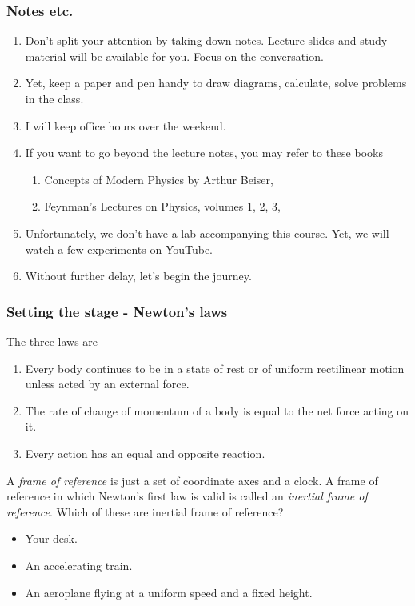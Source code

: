 \documentclass{beamer}
\begin{document}
\begin{frame}
\frametitle{Notes etc.}
\begin{enumerate}
\item Don't split your attention by taking down notes. Lecture slides and study
material will be available for you. Focus on the conversation.
\item Yet, keep a paper and pen handy to draw diagrams, calculate, solve 
problems in the class.
\item I will keep office hours over the weekend.
\item If you want to go beyond the lecture notes, you may refer to these books
\begin{enumerate}
\item Concepts of Modern Physics by Arthur Beiser,
\item Feynman's Lectures on Physics, volumes 1, 2, 3,
\end{enumerate}
\item Unfortunately, we don't have a lab accompanying this course. Yet, we will
watch a few experiments on YouTube.
\item Without further delay, let's begin the journey.
\end{enumerate}
\end{frame}

\begin{frame}
\frametitle{Setting the stage - Newton's laws}
The three laws are
\begin{enumerate}
\item Every body continues to be in a state of rest or of uniform rectilinear
motion unless acted by an external force.
\item The rate of change of momentum of a body is equal to the net force acting
on it.
\item Every action has an equal and opposite reaction.
\end{enumerate}
A \emph{frame of reference} is just a set of coordinate axes and a clock. A
frame of reference in which Newton's first law is valid is called an \emph{
inertial frame of reference}. Which of these are inertial frame of reference?
\begin{itemize}
\item Your desk.
\item An accelerating train.
\item An aeroplane flying at a uniform speed and a fixed height.
\end{itemize}
\end{frame}
\end{document}
